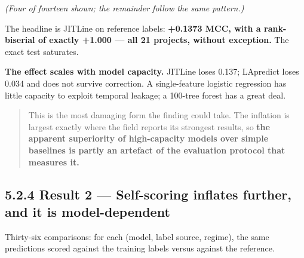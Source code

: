 \emph{(Four of fourteen shown; the remainder follow the same pattern.)}

The headline is JITLine on reference labels: \textbf{+0.1373 MCC, with a
rank-biserial of exactly +1.000 --- all 21 projects, without exception.}
The exact test saturates.

\textbf{The effect scales with model capacity.} JITLine loses 0.137;
LApredict loses 0.034 and does not survive correction. A single-feature
logistic regression has little capacity to exploit temporal leakage; a
100-tree forest has a great deal.

\begin{quote}
This is the most damaging form the finding could take. The inflation is
largest exactly where the field reports its strongest results, so
\textbf{the apparent superiority of high-capacity models over simple
baselines is partly an artefact of the evaluation protocol that measures
it.}
\end{quote}

\subsection{5.2.4 Result 2 --- Self-scoring inflates further, and it is
model-dependent}\label{result-2-self-scoring-inflates-further-and-it-is-model-dependent}

Thirty-six comparisons: for each (model, label source, regime), the same
predictions scored against the training labels versus against the
reference.

